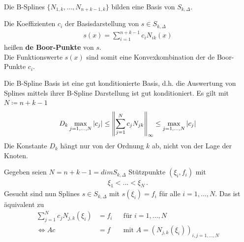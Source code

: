\begin{Fole}
  Die B-Splines $\{N_{1,k},\ldots,N_{n+k-1,k}\}$ bilden eine Basis von 
  $S_{k,\Delta}$.

  Die Koeffizienten $c_i$ der Basisdarstellung von $s \in S_{k,\Delta}$
  \begin{gather*}
    s(x)=\sum_{i=1}^{n+k-1}c_iN_{ik}(x)
  \end{gather*}
  heißen \textbf{de Boor-Punkte} von $s$. \\
  Die Funktionswerte $s(x)$ sind somit eine
  Konvexkombination der de Boor-Punkte $c_i$.
\end{Fole}


\begin{Beme}
  Die B-Spline Basis ist eine gut konditionierte Basis, d.h.
  die Auswertung von Splines mittels ihrer B-Spline
  Darstellung ist gut konditioniert.
  Es gilt mit $N\coloneqq n+k-1$
  \begin{gather*}
    D_k \max_{j=1,\ldots, N} |c_j| 
    \leq \left\| \sum^N_{j=1} c_j N_{jk} \right\|_{\infty}
    \leq \max_{j=1,\ldots, N} | c_j|
  \end{gather*}
  Die Konstante $D_k$ hängt nur von der Ordnung $k$ ab, nicht
  von der Lage der Knoten.
\end{Beme}


\label{6.2.13}
Gegeben seien $N=n+k-1=dimS_{k,\Delta}$ Stützpunkte $(\xi_i,f_i)$
mit
\begin{gather*}
  \xi_1<\dots<\xi_N\,.
\end{gather*}
Gesucht sind nun Splines $s\in S_{k,\Delta}$ 
mit $s(\xi_i)=f_i$ für alle $i=1, \dots, N$.
Das ist äquivalent zu 
\begin{align}
  \sum_{j=1}^N c_jN_{j,k}(\xi_i)&=f_i &&\text{für }i=1,\dots, N
                                         \label{VI.2.8}
  \\\nonumber
  \Leftrightarrow Ac&=f &&\text{mit } A=(N_{j,k}(\xi_i))_{i,j=1,\dots,N}
\end{align}

